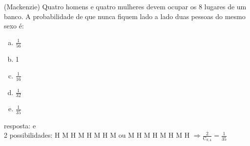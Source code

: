 \begin{ex}
(Mackenzie) Quatro homens e quatro mulheres devem ocupar os 8 lugares de um banco. A probabilidade de que nunca fiquem lado a lado duas pessoas do mesmo sexo é:
   \begin{enumerate}[(a)]
   \item $\frac{1}{56}$
   \item 1
   \item $\frac{1}{16}$
   \item $\frac{1}{32}$
   \item $\frac{1}{35}$
   \end{enumerate}
   \begin{sol}
    resposta: e\\
    2 possibilidades: H M H M H M H M ou M H M H M H M H  
    $\Longrightarrow \frac{2}{\mathrm{C}_{8,4}}=\frac{1}{35}$
   \end{sol}
\end{ex}